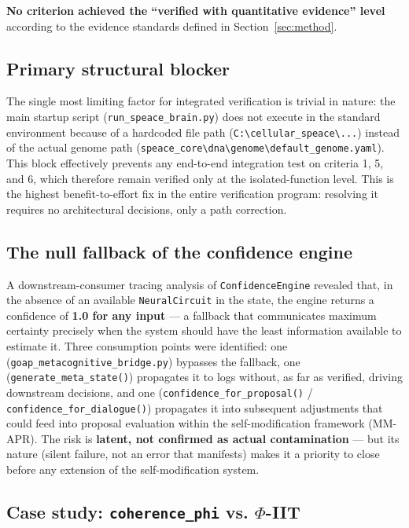 \documentclass[11pt,a4paper]{article}
\newcommand{\code}[1]{\texttt{#1}}
\newcommand{\coherencephi}{\code{coherence\_phi}}
\begin{document}
\noindent
\textbf{No criterion achieved the ``verified with quantitative evidence'' level} according to the evidence standards defined in Section~\ref{sec:method}.

\subsection{Primary structural blocker}
\label{sec:blocco}

The single most limiting factor for integrated verification is trivial in nature: the main startup script (\code{run\_speace\_brain.py}) does not execute in the standard environment because of a hardcoded file path (\code{C:\textbackslash cellular\_speace\textbackslash ...}) instead of the actual genome path (\code{speace\_core\textbackslash dna\textbackslash genome\textbackslash default\_genome.yaml}). This block effectively prevents any end-to-end integration test on criteria 1, 5, and 6, which therefore remain verified only at the isolated-function level. This is the highest benefit-to-effort fix in the entire verification program: resolving it requires no architectural decisions, only a path correction.

\subsection{The null fallback of the confidence engine}
\label{sec:fallback}

A downstream-consumer tracing analysis of \code{ConfidenceEngine} revealed that, in the absence of an available \code{NeuralCircuit} in the state, the engine returns a confidence of \textbf{1.0 for any input} --- a fallback that communicates maximum certainty precisely when the system should have the least information available to estimate it. Three consumption points were identified: one (\code{goap\_metacognitive\_bridge.py}) bypasses the fallback, one (\code{generate\_meta\_state()}) propagates it to logs without, as far as verified, driving downstream decisions, and one (\code{confidence\_for\_proposal()} / \code{confidence\_for\_dialogue()}) propagates it into subsequent adjustments that could feed into proposal evaluation within the self-modification framework (MM-APR). The risk is \textbf{latent, not confirmed as actual contamination} --- but its nature (silent failure, not an error that manifests) makes it a priority to close before any extension of the self-modification system.

\subsection{Case study: \coherencephi{} vs. $\Phi$-IIT}
\label{sec:coherence-phi}
\end{document}

